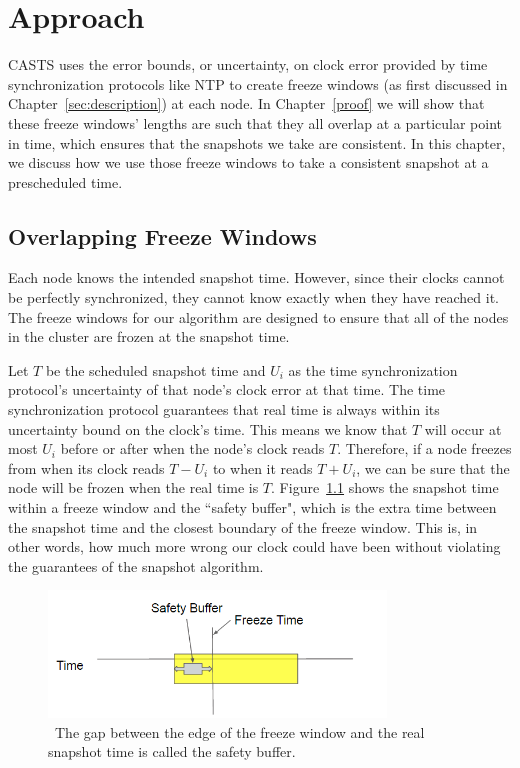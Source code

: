 \chapter{Approach}
\label{sec:approach}

CASTS uses the error bounds, or uncertainty, on clock
error provided by time synchronization protocols like NTP to create
freeze windows (as first discussed in Chapter~\ref{sec:description})
at each node. In Chapter~\ref{proof} we will show that these freeze
windows' lengths are such that they all overlap at a particular point
in time, which ensures that the snapshots we take are consistent. In
this chapter, we discuss how we use those freeze windows to take a
consistent snapshot at a prescheduled time.

\section{Overlapping Freeze Windows}
\label{sec:overlapping}

Each node knows the intended snapshot time. However, since their
clocks cannot be perfectly synchronized, they cannot know exactly when
they have reached it. The freeze windows for our algorithm are
designed to ensure that all of the nodes in the cluster are frozen at
the snapshot time.

Let $T$ be the scheduled snapshot time and $U_i$ as the time
synchronization protocol's uncertainty of that node's clock error at
that time. The time synchronization protocol guarantees that real time
is always within its uncertainty bound on the clock's time. This means
we know that $T$ will occur at most $U_i$ before or after when the
node's clock reads $T$. Therefore, if a node freezes from when its
clock reads $T - U_i$ to when it reads $T + U_i$, we can be sure that
the node will be frozen when the real time is $T$.
Figure~\ref{fig:safety-buff} shows the snapshot time within a freeze
window and the ``safety buffer", which is the extra time between the
snapshot time and the closest boundary of the freeze window. This is,
in other words, how much more wrong our clock could have been without
violating the guarantees of the snapshot algorithm.

\begin{figure}
\includegraphics[width=0.8\textwidth]{safety-diagram.png}
\caption{~The gap between the edge of the freeze window and the real snapshot time is called the safety buffer.}
\label{fig:safety-buff}
\end{figure}


